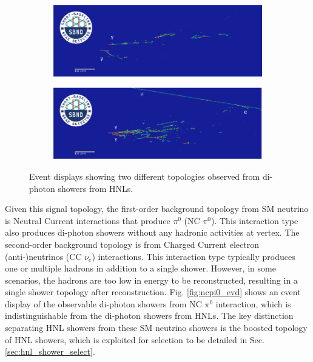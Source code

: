 \begin{figure}[htbp!]
	\centering
        \begin{subfigure}[b]{0.85\textwidth}  
            \centering 
            \includegraphics[width=\textwidth]{hnl_2shw}
            \caption{}%
	    \label{fig:hnl_evd_1shw}
        \end{subfigure}
        \centering
        \begin{subfigure}[b]{0.85\textwidth}   
            \centering 
            \includegraphics[width=\textwidth]{hnl_1shw}
            \caption{}%
	    \label{fig:hnl_evd_2shw}
	\end{subfigure}
        \caption{
		Event displays showing two different topologies observed from di-photon showers from HNLs. 
	}
        \label{fig:hnl_evd_select}
\end{figure}

Given this signal topology, the first-order background topology from SM neutrino is Neutral Current interactions that produce $\pi^0$ (NC $\pi^0$).
This interaction type also produces di-photon showers without any hadronic activities at vertex.
The second-order background topology is from Charged Current electron (anti-)neutrinos (CC $\nu_e$) interactions.
This interaction type typically produces one or multiple hadrons in addition to a single shower.
However, in some scenarios, the hadrons are too low in energy to be reconstructed, resulting in a single shower topology after reconstruction.
Fig. \ref{fig:ncpi0_evd} shows an event display of the observable di-photon showers from NC $\pi^0$ interaction, which is indistinguishable from the di-photon showers from HNLs.
The key distinction separating HNL showers from these SM neutrino showers is the boosted topology of HNL showers, which is exploited for selection to be detailed in Sec. \ref{sec:hnl_shower_select}.

